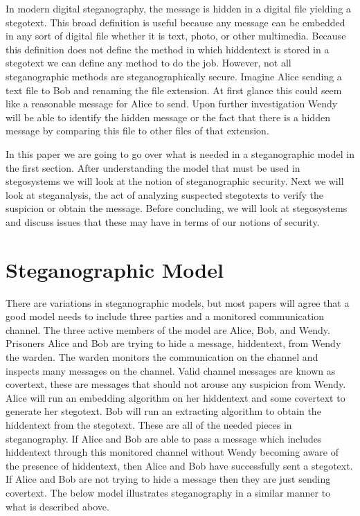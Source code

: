 \documentclass[11pt]{article}
\begin{document}
In modern digital steganography, the message is hidden in a digital
file yielding a stegotext. This broad definition is useful because any
message can be embedded in any sort of digital file whether it is
text, photo, or other multimedia. Because this definition does not
define the method in which hiddentext is stored in a stegotext we can
define any method to do the job. However, not all steganographic
methods are steganographically secure. Imagine Alice sending a text
file to Bob and renaming the file extension. At first glance this
could seem like a reasonable message for Alice to send. Upon further
investigation Wendy will be able to identify the hidden message or the
fact that there is a hidden message by comparing this file to other
files of that extension.

In this paper we are going to go over what is needed in a
steganographic model in the first section. After understanding the
model that must be used in stegosystems we will look at the notion of
steganographic security. Next we will look at steganalysis, the act of
analyzing suspected stegotexts to verify the suspicion or obtain the
message. Before concluding, we will look at stegosystems and discuss
issues that these may have in terms of our notions of security.

\section{Steganographic Model}
There are variations in steganographic models, but most papers will
agree that a good model needs to include three parties and a monitored
communication channel. The three active members of the model are
Alice, Bob, and Wendy. Prisoners Alice and Bob are trying to hide a
message, hiddentext, from Wendy the warden. The warden monitors the
communication on the channel and inspects many messages on the
channel. Valid channel messages are known as covertext, these are
messages that should not arouse any suspicion from Wendy. Alice will
run an embedding algorithm on her hiddentext and some covertext to
generate her stegotext. Bob will run an extracting algorithm to obtain
the hiddentext from the stegotext. These are all of the needed pieces
in steganography. If Alice and Bob are able to pass a message which
includes hiddentext through this monitored channel without Wendy
becoming aware of the presence of hiddentext, then Alice and Bob have
successfully sent a stegotext. If Alice and Bob are not trying to hide
a message then they are just sending covertext. The below model
illustrates steganography in a similar manner to what is described
above.
\end{document}
